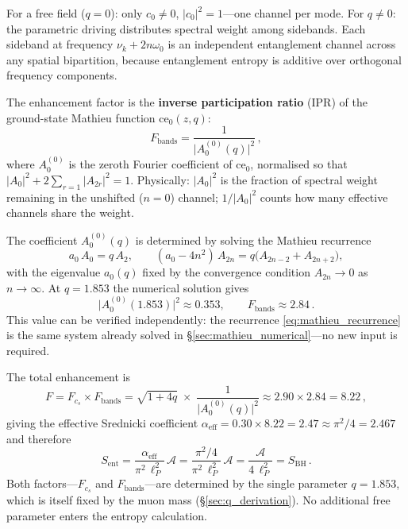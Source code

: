 \documentclass[11pt]{article}
\begin{document}
\begin{enumerate}
\begin{itemize}
    For a free field ($q = 0$): only $c_0 \neq 0$,
    $|c_0|^2 = 1$---one channel per mode.
    For $q \neq 0$: the parametric driving
    distributes spectral weight among sidebands.
    Each sideband at frequency $\nu_k + 2n\omega_0$
    is an independent entanglement channel across
    any spatial bipartition, because entanglement
    entropy is additive over orthogonal frequency
    components.

    The enhancement factor is the
    \textbf{inverse participation ratio} (IPR)
    of the ground-state Mathieu function
    $\mathrm{ce}_0(z, q)$:
    \begin{equation}\label{eq:Fbands_def}
      F_{\mathrm{bands}}
      = \frac{1}{\bigl|A_0^{(0)}(q)\bigr|^2}\,,
    \end{equation}
    where $A_0^{(0)}$ is the zeroth Fourier
    coefficient of $\mathrm{ce}_0$, normalised
    so that $|A_0|^2 + 2\sum_{r=1}|A_{2r}|^2 = 1$.
    Physically: $|A_0|^2$ is the fraction of
    spectral weight remaining in the unshifted
    ($n=0$) channel; $1/|A_0|^2$ counts how many
    effective channels share the weight.

    The coefficient $A_0^{(0)}(q)$ is determined
    by solving the Mathieu recurrence
    \begin{equation}\label{eq:mathieu_recurrence}
      a_0\,A_0 = q\,A_2,\qquad
      (a_0 - 4n^2)\,A_{2n}
      = q\bigl(A_{2n-2} + A_{2n+2}\bigr),
    \end{equation}
    with the eigenvalue $a_0(q)$ fixed by the
    convergence condition $A_{2n} \to 0$ as
    $n \to \infty$.  At $q = 1.853$ the numerical
    solution gives
    \begin{equation}\label{eq:Fbands_value}
      \bigl|A_0^{(0)}(1.853)\bigr|^2 \approx 0.353,
      \qquad
      F_{\mathrm{bands}} \approx 2.84\,.
    \end{equation}
    This value can be verified independently:
    the recurrence
    \eqref{eq:mathieu_recurrence} is the same
    system already solved in
    \S\ref{sec:mathieu_numerical}---no new
    input is required.
\end{itemize}
The total enhancement is
\begin{equation}\label{eq:F_total}
  F = F_{c_s} \times F_{\mathrm{bands}}
  = \sqrt{1+4q}\;\times\;
  \frac{1}{\bigl|A_0^{(0)}(q)\bigr|^2}
  \approx 2.90 \times 2.84 = 8.22\,,
\end{equation}
giving the effective Srednicki coefficient
$\alpha_{\mathrm{eff}} = 0.30 \times 8.22
= 2.47 \approx \pi^2/4 = 2.467$
and therefore
\begin{equation}\label{eq:S_ent_ISPG}
  \boxed{
  S_{\mathrm{ent}}
  = \frac{\alpha_{\mathrm{eff}}}
  {\pi^2\,\ell_P^2}\,\mathcal{A}
  = \frac{\pi^2/4}{\pi^2\,\ell_P^2}\,\mathcal{A}
  = \frac{\mathcal{A}}{4\,\ell_P^2}
  = S_{\mathrm{BH}}\,.
  }
\end{equation}
Both factors---$F_{c_s}$ and
$F_{\mathrm{bands}}$---are determined by
the single parameter $q = 1.853$, which is
itself fixed by the muon mass
(\S\ref{sec:q_derivation}).  No additional
free parameter enters the entropy calculation.


\end{enumerate}
\end{document}

